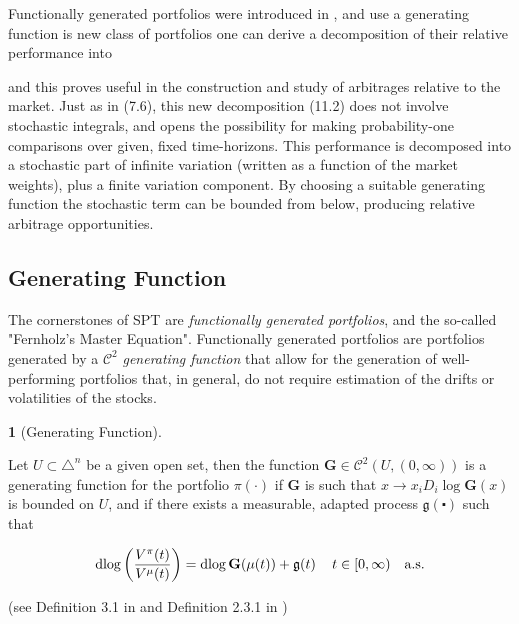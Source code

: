 \documentclass[british]{amsart} \usepackage{lmodern}
\numberwithin{equation}{section} \numberwithin{figure}{section}
\theoremstyle{plain} \newtheorem{thm}{\protect\theoremname}[section]
\theoremstyle{definition} \newtheorem{defn}[thm]{\protect\definitionname}
\theoremstyle{plain} \newtheorem{assumption}[thm]{\protect\assumptionname}
\theoremstyle{plain} \newtheorem{lem}[thm]{\protect\lemmaname}
\theoremstyle{plain} \newtheorem{prop}[thm]{\protect\propositionname}
\theoremstyle{remark} \newtheorem{rem}[thm]{\protect\remarkname}
\theoremstyle{plain} \newtheorem{cor}[thm]{\protect\corollaryname}
\renewcommand{\d}[1]{\mathop{\mathrm{d}{#1}}}
\begin{document}
Functionally generated portfolios were introduced in \cite{fernholz1999pgf}, and
use a generating function 
is new class of portfolios one can derive a decomposition of their relative
performance into 

and this proves useful in the construction
and study of arbitrages relative to the market. Just as in (7.6), this new
decomposition (11.2) does not involve stochastic integrals, and opens the
possibility for making probability-one comparisons over given, fixed
time-horizons.
This performance is decomposed into a stochastic part of
infinite variation (written as a function of the market weights), plus a
finite variation component. By choosing a suitable generating function the
stochastic term can be bounded from below, producing relative arbitrage
opportunities.


\subsection{Generating Function}

The cornerstones of SPT are \textit{functionally generated portfolios}, and
the so-called "Fernholz's Master Equation". Functionally generated portfolios are
portfolios generated by a $\mathcal{C}^2$ \textit{generating function} that allow
for the generation of well-performing portfolios that, in general, do not require
estimation of the drifts or volatilities of the stocks. 

\begin{defn} [Generating Function] 
  
  \label{def:generatingfunction}

  Let $U \subset \triangle^{n}$ be a given open set, then the function
  $\mathbf{G}\in\mathcal{C}^{2}(U,(0,\infty))$ is a generating function for the
  portfolio $\pi(\cdot)$ if $\mathbf{G}$ is such that $x\to
  x_{i}D_{i}\log\mathbf{G}(x)$ is bounded on $U$, and if there exists a
  measurable, adapted process $\mathfrak{g}(\centerdot)$ such that 

  \begin{equation}
    \d{ \log \left( \frac{V^{\pi}(t)}{V^{\mu}(t)} \right) } = 
    \d{ \log \mathbf{G}(\mu(t)) + \mathfrak{g}(t) }
    \quad \ranget
    \quad \almostsurely
  \end{equation}

  (see 
    Definition 3.1 in \cite{fernholz1999pgf} and 
    Definition 2.3.1 in \cite{vervuurt2015})

\end{defn}
\end{document}
